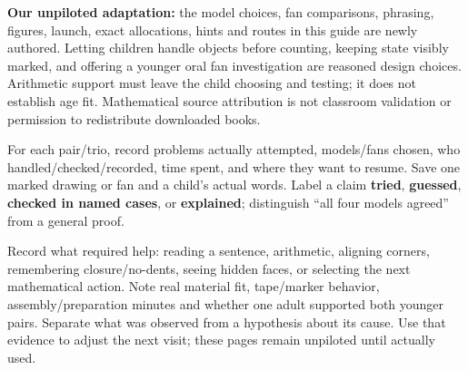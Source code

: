 \documentclass[11pt,letterpaper]{article}
\newcommand{\sub}[1]{\par\vspace{3pt}{\bfseries #1}\par}
\begin{document}
\textbf{Our unpiloted adaptation:} the model choices, fan comparisons, phrasing, figures, launch, exact allocations, hints and routes in this guide are newly authored. Letting children handle objects before counting, keeping state visibly marked, and offering a younger oral fan investigation are reasoned design choices. Arithmetic support must leave the child choosing and testing; it does not establish age fit. Mathematical source attribution is not classroom validation or permission to redistribute downloaded books.

\sub{After the session: an observation, not a verdict}
For each pair/trio, record problems actually attempted, models/fans chosen, who handled/checked/recorded, time spent, and where they want to resume. Save one marked drawing or fan and a child's actual words. Label a claim \textbf{tried}, \textbf{guessed}, \textbf{checked in named cases}, or \textbf{explained}; distinguish ``all four models agreed'' from a general proof.

Record what required help: reading a sentence, arithmetic, aligning corners, remembering closure/no-dents, seeing hidden faces, or selecting the next mathematical action. Note real material fit, tape/marker behavior, assembly/preparation minutes and whether one adult supported both younger pairs. Separate what was observed from a hypothesis about its cause. Use that evidence to adjust the next visit; these pages remain unpiloted until actually used.
\end{document}
